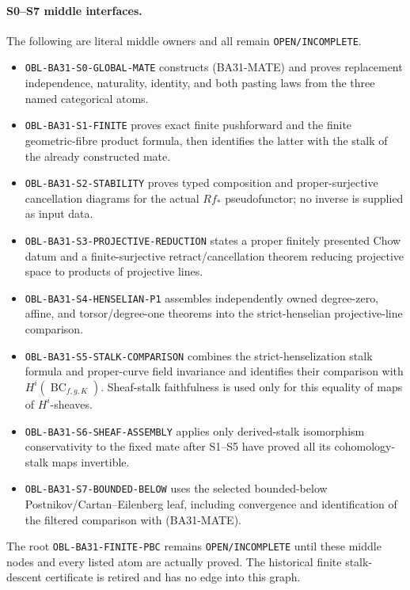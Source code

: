 \paragraph{S0--S7 middle interfaces.}
The following are literal middle owners and all remain
\texttt{OPEN/INCOMPLETE}.
\begin{itemize}
\item \texttt{OBL-BA31-S0-GLOBAL-MATE} constructs \textup{(BA31-MATE)} and
  proves replacement independence, naturality, identity, and both pasting
  laws from the three named categorical atoms.
\item \texttt{OBL-BA31-S1-FINITE} proves exact finite pushforward and the
  finite geometric-fibre product formula, then identifies the latter with
  the stalk of the already constructed mate.
\item \texttt{OBL-BA31-S2-STABILITY} proves typed composition and
  proper-surjective cancellation diagrams for the actual $Rf_*$
  pseudofunctor; no inverse is supplied as input data.
\item \texttt{OBL-BA31-S3-PROJECTIVE-REDUCTION} states a proper finitely
  presented Chow datum and a finite-surjective retract/cancellation theorem
  reducing projective space to products of projective lines.
\item \texttt{OBL-BA31-S4-HENSELIAN-P1} assembles independently owned
  degree-zero, affine, and torsor/degree-one theorems into the strict-henselian
  projective-line comparison.
\item \texttt{OBL-BA31-S5-STALK-COMPARISON} combines the strict-henselization
  stalk formula and proper-curve field invariance and identifies their
  comparison with $H^i(\operatorname{BC}_{f,g,K})$.  Sheaf-stalk
  faithfulness is used only for this equality of maps of $H^i$-sheaves.
\item \texttt{OBL-BA31-S6-SHEAF-ASSEMBLY} applies only derived-stalk
  isomorphism conservativity to the fixed mate after S1--S5 have proved all
  its cohomology-stalk maps invertible.
\item \texttt{OBL-BA31-S7-BOUNDED-BELOW} uses the selected bounded-below
  Postnikov/Cartan--Eilenberg leaf, including convergence and identification
  of the filtered comparison with \textup{(BA31-MATE)}.
\end{itemize}
The root \texttt{OBL-BA31-FINITE-PBC} remains
\texttt{OPEN/INCOMPLETE} until these middle nodes and every listed atom are
actually proved.  The historical finite stalk-descent certificate is retired
and has no edge into this graph.

